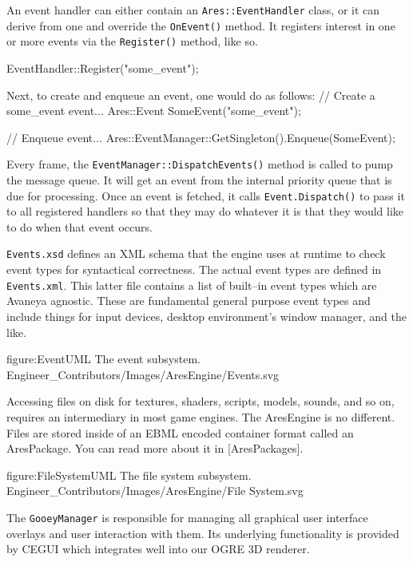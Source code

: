 An event handler can either contain an {\tt Ares::EventHandler} class, or it can derive from one and override the {\tt OnEvent()} method. It registers interest in one or more events via the {\tt Register()} method, like so.

\startCodeExample
EventHandler::Register("some_event");
\stopCodeExample

Next, to create and enqueue an event, one would do as follows:
\startCodeExample
// Create a some_event event...
Ares::Event SomeEvent("some_event");

// Enqueue event...
Ares::EventManager::GetSingleton().Enqueue(SomeEvent);
\stopCodeExample

Every frame, the {\tt EventManager::DispatchEvents()} method is called to pump the message queue. It will get an event from the internal priority queue that is due for processing. Once an event is fetched, it calls {\tt Event.Dispatch()} to pass it to all registered handlers so that they may do whatever it is that they would like to do when that event occurs.

{\tt Events.xsd} defines an XML schema that the engine uses at runtime to check event types for syntactical correctness. The actual event types are defined in {\tt Events.xml}. This latter file contains a list of built--in event types which are Avaneya agnostic. These are fundamental general purpose event types and include things for input devices, desktop environment's window manager, and the like.

\FullPageDiagram
    {figure:EventUML}
    {The event subsystem.}
    {Engineer_Contributors/Images/AresEngine/Events.svg}

\page 
{}
Accessing files on disk for textures, shaders, scripts, models, sounds, and so on, requires an intermediary in most game engines. The AresEngine is no different. Files are stored inside of an EBML encoded container format called an AresPackage. You can read more about it in [AresPackages]. 

\FullPageDiagram
    {figure:FileSystemUML}
    {The file system subsystem.}
    {Engineer_Contributors/Images/AresEngine/File System.svg}

\page 
{}
The {\tt GooeyManager} is responsible for managing all graphical user interface overlays and user interaction with them. Its underlying functionality is provided by CEGUI which integrates well into our OGRE 3D renderer.

